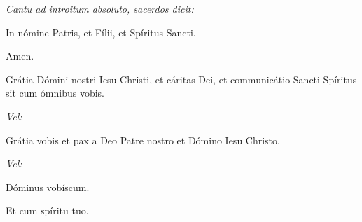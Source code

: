\textit{Cantu ad introitum absoluto, sacerdos dicit:}

In nómine Patris, et Fílii, \grecross{} et Spíritus Sancti.

\Rbardot{} Amen.

\Vbardot{} Grátia Dómini nostri Iesu Christi, et cáritas Dei, et communicátio Sancti
Spíritus sit cum ómnibus vobis.

\textit{\color{red}Vel:}

\Vbardot{} Grátia vobis et pax a Deo Patre nostro et Dómino Iesu Christo.

\textit{\color{red}Vel:}

\Vbardot{} Dóminus vobíscum.

\Rbardot{} Et cum spíritu tuo.

